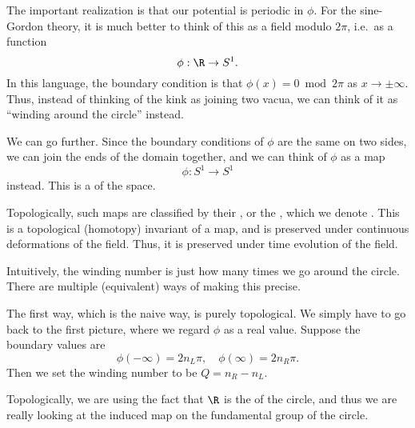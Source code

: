 \documentclass[a4paper]{article}
\begin{document}
The important realization is that our potential is periodic in $\phi$. For the sine-Gordon theory, it is much better to think of this as a field modulo $2\pi$, i.e.\ as a function
\[
  \phi: \R \to S^1.
\]
In this language, the boundary condition is that $\phi(x) = 0 \bmod 2\pi$ as $x \to \pm \infty$. Thus, instead of thinking of the kink as joining two vacua, we can think of it as ``winding around the circle'' instead.

We can go further. Since the boundary conditions of $\phi$ are the same on two sides, we can join the ends of the domain together, and we can think of $\phi$ as a map
\[
  \phi: S^1 \to S^1
\]
instead. This is a  of the space.

Topologically, such maps are classified by their , or the , which we denote . This is a topological (homotopy) invariant of a map, and is preserved under continuous deformations of the field. Thus, it is preserved under time evolution of the field.

Intuitively, the winding number is just how many times we go around the circle. There are multiple (equivalent) ways of making this precise.

\separator

The first way, which is the naive way, is purely topological. We simply have to go back to the first picture, where we regard $\phi$ as a real value. Suppose the boundary values are
\[
  \phi(-\infty) = 2 n_L \pi,\quad \phi(\infty) = 2 n_R \pi.
\]
Then we set the winding number to be $Q = n_R - n_L$.

Topologically, we are using the fact that $\R$ is the  of the circle, and thus we are really looking at the induced map on the fundamental group of the circle.
\end{document}
